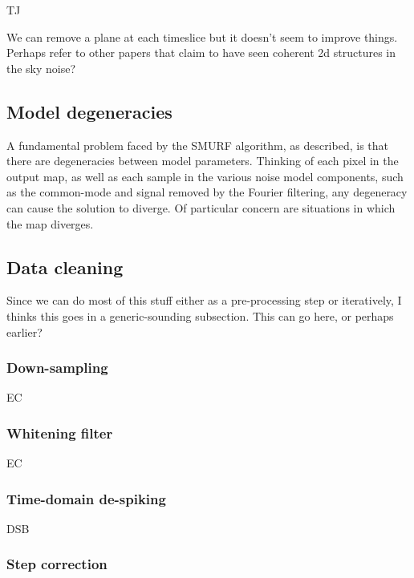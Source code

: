 \documentclass[useAMS,usenatbib,nofootinbib]{mn2e}
\begin{document}
TJ

We can remove a plane at each timeslice but it doesn't seem to improve
things. Perhaps refer to other papers that claim to have seen coherent
2d structures in the sky noise?

\subsection{Model degeneracies}

A fundamental problem faced by the SMURF algorithm, as described, is
that there are degeneracies between model parameters. Thinking of each
pixel in the output map, as well as each sample in the various noise
model components, such as the common-mode and signal removed by the
Fourier filtering, any degeneracy can cause the solution to
diverge. Of particular concern are situations in which the map
diverges.

\subsection{Data cleaning}

Since we can do most of this stuff either as a pre-processing step or
iteratively, I thinks this goes in a generic-sounding subsection. This
can go here, or perhaps earlier?

\subsubsection{Down-sampling}

EC

\subsubsection{Whitening filter}

EC

\subsubsection{Time-domain de-spiking}
\label{sec:timedespike}

DSB

\subsubsection{Step correction}
\label{sec:steps}
\end{document}
